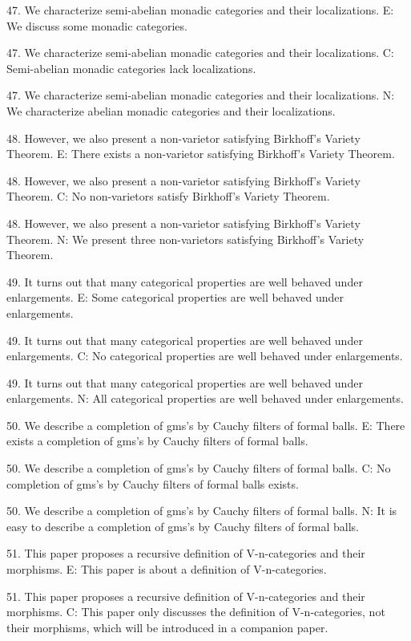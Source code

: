 47. We characterize semi-abelian monadic categories and their localizations.
E: We discuss some monadic categories.

47. We characterize semi-abelian monadic categories and their localizations.
C: Semi-abelian monadic categories lack localizations.

47. We characterize semi-abelian monadic categories and their localizations.
N: We characterize abelian monadic categories and their localizations.

48. However, we also present a non-varietor satisfying Birkhoff's Variety Theorem.
E: There exists a non-varietor satisfying Birkhoff's Variety Theorem.

48. However, we also present a non-varietor satisfying Birkhoff's Variety Theorem.
C: No non-varietors satisfy Birkhoff's Variety Theorem.

48. However, we also present a non-varietor satisfying Birkhoff's Variety Theorem.
N: We present three non-varietors satisfying Birkhoff's Variety Theorem.

49. It turns out that many categorical properties are well behaved under enlargements.
E: Some categorical properties are well behaved under enlargements.

49. It turns out that many categorical properties are well behaved under enlargements.
C: No categorical properties are well behaved under enlargements.

49. It turns out that many categorical properties are well behaved under enlargements.
N: All categorical properties are well behaved under enlargements.

50. We describe a completion of gms's by Cauchy filters of formal balls.
E: There exists a completion of gms's by Cauchy filters of formal balls.

50. We describe a completion of gms's by Cauchy filters of formal balls.
C: No completion of gms's by Cauchy filters of formal balls exists.

50. We describe a completion of gms's by Cauchy filters of formal balls.
N: It is easy to describe a completion of gms's by Cauchy filters of formal balls.

51. This paper proposes a recursive definition of V-n-categories and their morphisms.
E: This paper is about a definition of V-n-categories.

51. This paper proposes a recursive definition of V-n-categories and their morphisms.
C: This paper only discusses the definition of V-n-categories, not their morphisms, which will be introduced in a companion paper.

